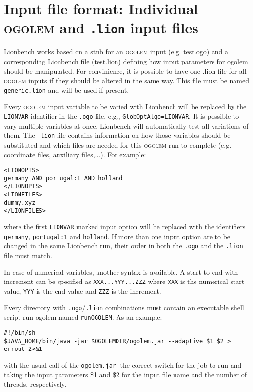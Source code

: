 \documentclass[a4paper,10pt]{scrbook}
\newcommand{\ogo}{\textsc{ogolem}}
\begin{document}
\section{Input file format: Individual \ogo{} and \texttt{.lion} input files}
Lionbench works based on a stub for an \ogo{} input (e.g. test.ogo) and a 
corresponding Lionbench file (test.lion) defining how input parameters for 
ogolem should be manipulated. For convinience, it is possible to have one .lion 
file for all \ogo{} inputs if they should be altered in the same way. This file 
must be named \texttt{generic.lion} and will be used if present.

Every \ogo{} input variable to be varied with Lionbench will be replaced by the 
\texttt{LIONVAR} identifier in the \texttt{.ogo} file, e.g., 
\texttt{GlobOptAlgo=LIONVAR}. It is possible to vary multiple variables at 
once, Lionbench will automatically test all variations of them. The 
\texttt{.lion} file contains information on how those variables should be 
substituted and which files are needed for this \ogo{} run to complete (e.g. 
coordinate files, auxiliary files,...). For example:

\begin{verbatim}
<LIONOPTS>
germany AND portugal:1 AND holland
</LIONOPTS>
<LIONFILES>
dummy.xyz
</LIONFILES>
\end{verbatim}
where the first \texttt{LIONVAR} marked input option will be replaced with the 
identifiers \texttt{germany}, \texttt{portugal:1} and \texttt{holland}. If more 
than one input option are to be changed in the same Lionbench run, their order 
in both the \texttt{.ogo} and the \texttt{.lion} file must match.

In case of numerical variables, another syntax is available. A start to end 
with increment can be specified as \texttt{XXX...YYY...ZZZ} where \texttt{XXX} 
is the numerical start value, \texttt{YYY} is the end value and \texttt{ZZZ} is 
the increment.

Every directory with \texttt{.ogo}/\texttt{.lion} combinations must contain an 
executable shell script run ogolem named \texttt{runOGOLEM}. As an example:
\begin{verbatim}
#!/bin/sh
$JAVA_HOME/bin/java -jar $OGOLEMDIR/ogolem.jar --adaptive $1 $2 > errout 2>&1
\end{verbatim}
with the usual call of the \texttt{ogolem.jar}, the correct switch for the job 
to run and taking the input parameters \$1 and \$2 for the input file name and 
the number of threads, respectively.
\end{document}

